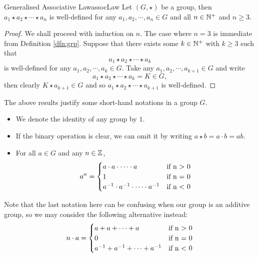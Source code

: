 \documentclass[math]{amznotes}
\theoremstyle{remark}
\newcommand{\0}{\mathbf{0}}
\newcommand{\1}{\mathbf{1}}
\begin{document}
\begin{thmbox}{Generalised Associative Law}{assocLaw}
    Let $\left(G, \star\right)$ be a group, then $a_1 \star a_2 \star \cdots \star a_n$ is well-defined for any $a_1, a_2, \cdots, a_n \in G$ and all $n \in \mathbb{N}^+$ and $n \geq 3$.
    \tcblower
    \begin{proof}
        We shall proceed with induction on $n$. The case where $n = 3$ is immediate from Definition \ref{dfn:grp}. Suppose that there exists some $k \in \mathbb{N}^+$ with $k \geq 3$ such that 
        \begin{equation*}
            a_1 \star a_2 \star \cdots \star a_k
        \end{equation*}
        is well-defined for any $a_1, a_2, \cdots, a_k \in G$. Take any $a_1, a_2, \cdots, a_{k + 1} \in G$ and write 
        \begin{equation*}
            a_1 \star a_2 \star \cdots \star a_k = K \in G,
        \end{equation*}
        then clearly $K \star a_{k + 1} \in G$ and so $a_1 \star a_2 \star \cdots \star a_{k + 1}$ is well-defined.
    \end{proof}
\end{thmbox}
The above results justify some short-hand notations in a group $G$. 
\begin{itemize}
    \item We denote the identity of any group by $1$.
    \item If the binary operation is clear, we can omit it by writing $a \star b = a \cdot b = ab$.
    \item For all $a \in G$ and any $n \in \mathbb{Z}$, 
    \begin{equation*}
        a^n = \begin{cases}
            a \cdot a \cdot \cdots \cdot a & \textrm{if } $n > 0$ \\
            1 & \textrm{if } $n = 0$ \\
            a^{-1} \cdot a^{-1} \cdot \cdots \cdot a^{-1} & \textrm{if } $n < 0$ \\
        \end{cases}
    \end{equation*}
\end{itemize}
Note that the last notation here can be confusing when our group is an additive group, so we may consider the following alternative instead:
\begin{equation*}
    n \cdot a = \begin{cases}
        a + a + \cdots + a & \textrm{if } $n > 0$ \\
        0 & \textrm{if } $n = 0$ \\
        a^{-1} + a^{-1} + \cdots + a^{-1} & \textrm{if } $n < 0$ \\
    \end{cases}
\end{equation*}
\end{document}
